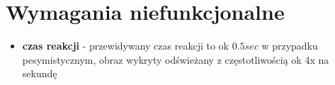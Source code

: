 \documentclass[a4paper]{mwart}
\begin{document}
\section{Wymagania niefunkcjonalne}

\begin{itemize}
	\item \textbf{czas reakcji} - przewidywany czas reakcji to ok $0.5 sec$ w przypadku pesymistycznym, obraz wykryty odświeżany z częstotliwością ok 4x na sekundę
\end{itemize}


\end{document}
